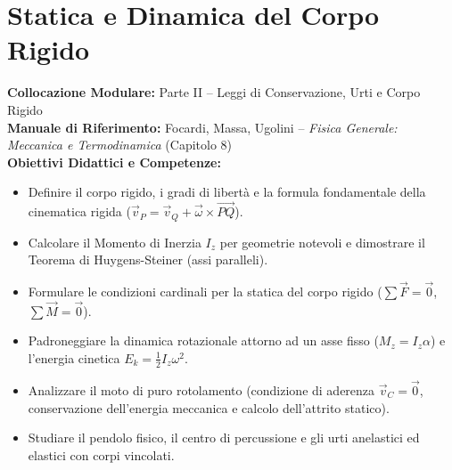 \chapter{Statica e Dinamica del Corpo Rigido}
\label{chap:dinamica_statica_corpo_rigido}

\begin{tcolorbox}[enhanced, breakable, colback=navyblue!4!white, colframe=navyblue!80!black,
    coltitle=white, fonttitle=\bfseries\sffamily, title={Quadro Sinottico del Capitolo 08},
    sharp corners, rounded corners=south, boxrule=1pt]
\textbf{Collocazione Modulare:} Parte II -- Leggi di Conservazione, Urti e Corpo Rigido\\
\textbf{Manuale di Riferimento:} Focardi, Massa, Ugolini -- \emph{Fisica Generale: Meccanica e Termodinamica} (Capitolo 8)\\
\textbf{Obiettivi Didattici e Competenze:}\par
\begin{itemize}
    \item Definire il corpo rigido, i gradi di libertà e la formula fondamentale della cinematica rigida ($\vec{v}_P = \vec{v}_Q + \vec{\omega}\times\vec{PQ}$).
    \item Calcolare il Momento di Inerzia $I_z$ per geometrie notevoli e dimostrare il Teorema di Huygens-Steiner (assi paralleli).
    \item Formulare le condizioni cardinali per la statica del corpo rigido ($\sum\vec{F} = \vec{0}$, $\sum\vec{M} = \vec{0}$).
    \item Padroneggiare la dinamica rotazionale attorno ad un asse fisso ($M_z = I_z \alpha$) e l'energia cinetica $E_k = \frac{1}{2}I_z\omega^2$.
    \item Analizzare il moto di puro rotolamento (condizione di aderenza $\vec{v}_C = \vec{0}$, conservazione dell'energia meccanica e calcolo dell'attrito statico).
    \item Studiare il pendolo fisico, il centro di percussione e gli urti anelastici ed elastici con corpi vincolati.
\end{itemize}
\end{tcolorbox}

\vspace{0.5em}

